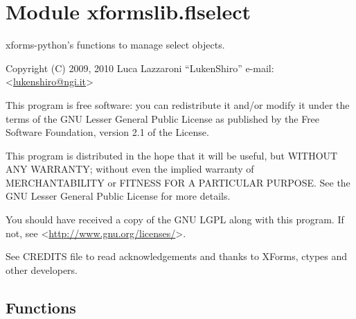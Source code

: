 %
%
%


\section{Module xformslib.flselect}

    \label{xformslib:flselect}

xforms-python's functions to manage select objects.

Copyright (C) 2009, 2010  Luca Lazzaroni ``LukenShiro''
e-mail: <\href{mailto:lukenshiro@ngi.it}{lukenshiro@ngi.it}>

This program is free software: you can redistribute it and/or modify
it under the terms of the GNU Lesser General Public License as
published by the Free Software Foundation, version 2.1 of the License.

This program is distributed in the hope that it will be useful,
but WITHOUT ANY WARRANTY; without even the implied warranty of
MERCHANTABILITY or FITNESS FOR A PARTICULAR PURPOSE. See the
GNU Lesser General Public License for more details.

You should have received a copy of the GNU LGPL along with this
program. If not, see <\href{http://www.gnu.org/licenses/}{http://www.gnu.org/licenses/}>.

See CREDITS file to read acknowledgements and thanks to XForms,
ctypes and other developers.


  \subsection{Functions}

    \label{xformslib:flselect:fl_add_select}

